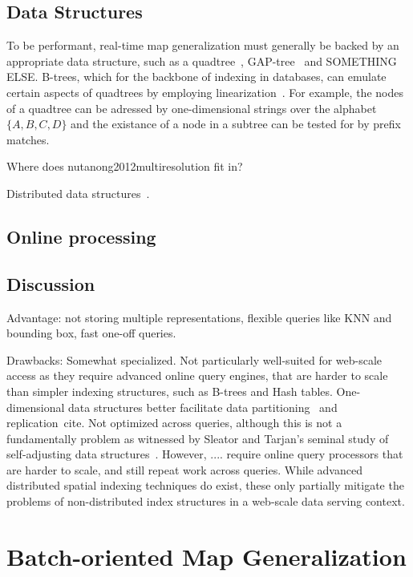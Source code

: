 \documentclass[11pt, oneside]{report}
\begin{document}
{%
\subsection{Data Structures}
To be performant, real-time map generalization must generally be backed by an appropriate data structure, such as a quadtree~\cite{bereuter2013real}, GAP-tree~\cite{van1995gap} and SOMETHING ELSE. B-trees, which for the backbone of indexing in databases, can emulate certain aspects of quadtrees by employing linearization~\cite{zcurve, hilbertcurve}. For example, the nodes of a quadtree can be adressed by one-dimensional strings over the alphabet $\lbrace A, B, C, D \rbrace$ and the existance of a node in a subtree can be tested for by prefix matches.

Where does nutanong2012multiresolution fit in?

Distributed data structures~\cite{paralleluniverse2012spacebase}.

\subsection{Online processing}

\subsection{Discussion}
Advantage: not storing multiple representations, flexible queries like KNN and bounding box, fast one-off queries.

Drawbacks: Somewhat specialized. Not particularly well-suited for web-scale access as they  require advanced online query engines, that are harder to scale than simpler indexing structures, such as B-trees and Hash tables. One-dimensional data structures better facilitate data partitioning~\cite{consistenthashing} and replication~cite{}.  Not optimized across queries, although this is not a fundamentally problem as witnessed by Sleator and Tarjan's seminal study of self-adjusting data structures~\cite{tarjan1985selfadjusting}. However, .... require online query processors that are harder to scale, and still repeat work across queries. While advanced distributed spatial indexing techniques do exist, these only partially mitigate the problems of non-distributed index structures in a web-scale data serving context.

\section{Batch-oriented Map Generalization}

}
\end{document}
